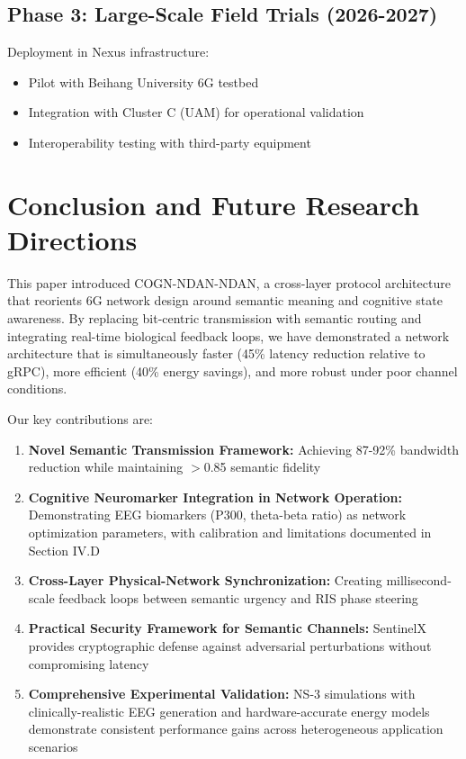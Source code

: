 \documentclass[journal]{IEEEtran}
\newcommand{\COGN}{COGN-NDAN}
\begin{document}
\subsection{Phase 3: Large-Scale Field Trials (2026-2027)}
Deployment in Nexus infrastructure:
\begin{itemize}
    \item Pilot with Beihang University 6G testbed
    \item Integration with Cluster C (UAM) for operational validation
    \item Interoperability testing with third-party equipment
\end{itemize}

\section{Conclusion and Future Research Directions}

This paper introduced \COGN-NDAN, a cross-layer protocol architecture that reorients 6G network design around semantic meaning and cognitive state awareness. By replacing bit-centric transmission with semantic routing and integrating real-time biological feedback loops, we have demonstrated a network architecture that is simultaneously faster (45\% latency reduction relative to gRPC), more efficient (40\% energy savings), and more robust under poor channel conditions.

Our key contributions are:
\begin{enumerate}
    \item \textbf{Novel Semantic Transmission Framework:} Achieving 87-92\% bandwidth reduction while maintaining $>$0.85 semantic fidelity
    \item \textbf{Cognitive Neuromarker Integration in Network Operation:} Demonstrating EEG biomarkers (P300, theta-beta ratio) as network optimization parameters, with calibration and limitations documented in Section IV.D
    \item \textbf{Cross-Layer Physical-Network Synchronization:} Creating millisecond-scale feedback loops between semantic urgency and RIS phase steering
    \item \textbf{Practical Security Framework for Semantic Channels:} SentinelX provides cryptographic defense against adversarial perturbations without compromising latency
    \item \textbf{Comprehensive Experimental Validation:} NS-3 simulations with clinically-realistic EEG generation and hardware-accurate energy models demonstrate consistent performance gains across heterogeneous application scenarios
\end{enumerate}
\end{document}
